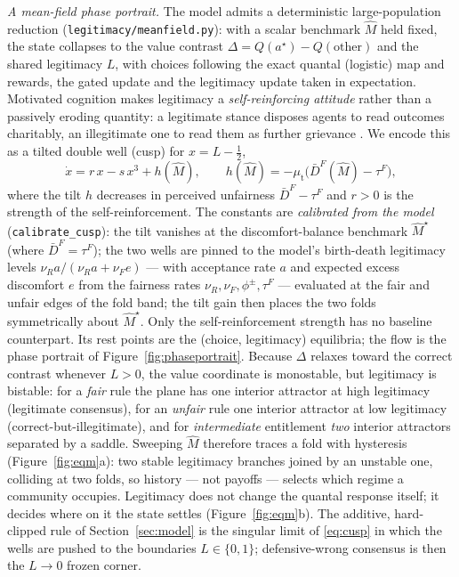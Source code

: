 \documentclass[11pt]{article}
\newcommand{\1}{\mathbf{1}}
\begin{document}
\emph{A mean-field phase portrait.} The model admits a deterministic
large-population reduction (\texttt{legitimacy/meanfield.py}): with a scalar
benchmark $\hat M$ held fixed, the state collapses to the value contrast
$\Delta=Q(a^\star)-Q(\text{other})$ and the shared legitimacy $L$, with choices
following the exact quantal (logistic) map and rewards, the gated update and the
legitimacy update taken in expectation. Motivated cognition makes legitimacy a
\emph{self-reinforcing attitude} rather than a passively eroding quantity: a
legitimate stance disposes agents to read outcomes charitably, an illegitimate
one to read them as further grievance \citep{Kunda1990,Festinger1957}. We encode
this as a tilted double well (cusp) for $x=L-\tfrac12$,
\begin{equation}
\dot x = r\,x - s\,x^3 + h(\hat M),\qquad
h(\hat M)=-\mu_{\mathrm{t}}\big(\bar D^F(\hat M)-\tau^F\big),
\label{eq:cusp}
\end{equation}
where the tilt $h$ decreases in perceived unfairness $\bar D^F-\tau^F$ and $r>0$
is the strength of the self-reinforcement. The constants are \emph{calibrated
from the model} (\texttt{calibrate\_cusp}): the tilt vanishes at the
discomfort-balance benchmark $\hat M^\star$ (where $\bar D^F=\tau^F$); the two
wells are pinned to the model's birth-death legitimacy levels
$\nu_R a/(\nu_R a+\nu_F e)$ --- with acceptance rate $a$ and expected excess
discomfort $e$ from the fairness rates $\nu_R,\nu_F,\phi^\pm,\tau^F$ --- evaluated
at the fair and unfair edges of the fold band; the tilt gain then places the two
folds symmetrically about $\hat M^\star$. Only the self-reinforcement strength has
no baseline counterpart. Its rest points are the
(choice, legitimacy) equilibria; the flow is the phase portrait of
Figure~\ref{fig:phaseportrait}. Because $\Delta$ relaxes toward the correct
contrast whenever $L>0$, the value coordinate is monostable, but legitimacy is
bistable: for a \emph{fair} rule the plane has one interior attractor at high
legitimacy (legitimate consensus), for an \emph{unfair} rule one interior
attractor at low legitimacy (correct-but-illegitimate), and for
\emph{intermediate} entitlement \emph{two} interior attractors separated by a
saddle. Sweeping $\hat M$ therefore traces a fold with hysteresis
(Figure~\ref{fig:eqm}a): two stable legitimacy branches joined by an unstable
one, colliding at two folds, so history --- not payoffs --- selects which regime a
community occupies. Legitimacy does not change the quantal response itself; it
decides where on it the state settles (Figure~\ref{fig:eqm}b). The additive,
hard-clipped rule of Section~\ref{sec:model} is the singular limit of
\eqref{eq:cusp} in which the wells are pushed to the boundaries $L\in\{0,1\}$;
defensive-wrong consensus is then the $L\!\to\!0$ frozen corner.
\end{document}

